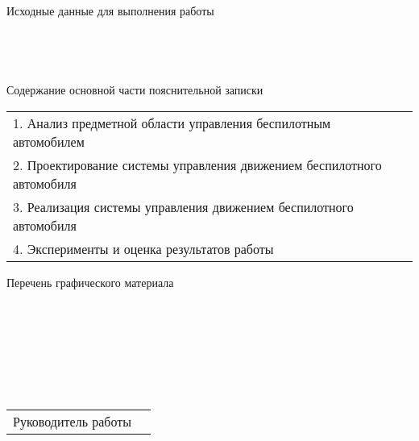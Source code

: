 
\noindent
Исходные данные для выполнения работы \\
\underline{\hspace{\linewidth}} \\
\underline{\hspace{\linewidth}} \\
\underline{\hspace{\linewidth}} \\
\underline{\hspace{\linewidth}} \\

\noindent
Содержание основной части пояснительной записки \\
\renewcommand{\arraystretch}{1}
\begin{tabularx}{\linewidth}{X}
    1. Анализ предметной области управления беспилотным автомобилем \\
    2. Проектирование системы управления движением беспилотного автомобиля \\
    3. Реализация системы управления движением беспилотного автомобиля \\
    4. Эксперименты и оценка результатов работы \\
\end{tabularx}

\newpage

\begin{center}
    Перечень графического материала
\end{center}

\noindent
\underline{\hspace{\linewidth}} \\
\underline{\hspace{\linewidth}} \\
\underline{\hspace{\linewidth}} \\
\underline{\hspace{\linewidth}} \\
\underline{\hspace{\linewidth}} \\
\underline{\hspace{\linewidth}} \\

\noindent
\begin{tabularx}{\linewidth}{@{}lP@{}}
    Руководитель работы  & 
\end{tabularx}

